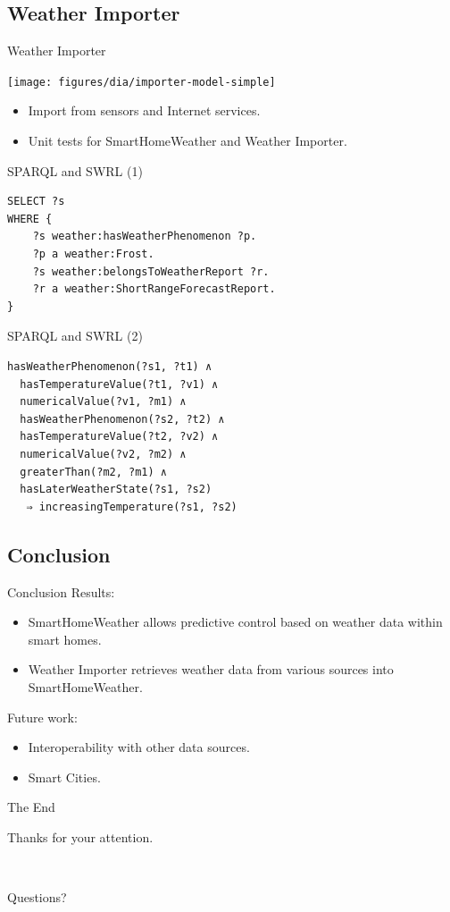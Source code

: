 \documentclass{beamer}
\begin{document}
\subsection{Weather Importer}

\begin{frame}{Weather Importer}
	\begin{center}
		\texttt{[image: figures/dia/importer-model-simple]}
	\end{center}

	\begin{itemize}
		\item Import from sensors and Internet services.
		\item Unit tests for SmartHomeWeather and Weather Importer.
	\end{itemize}
\end{frame}

\begin{frame}[fragile]{SPARQL and SWRL (1)}
	\begin{framed}
		\begin{verbatim}
SELECT ?s
WHERE {
    ?s weather:hasWeatherPhenomenon ?p.
    ?p a weather:Frost.
    ?s weather:belongsToWeatherReport ?r.
    ?r a weather:ShortRangeForecastReport.
}
		\end{verbatim}
	\end{framed}
\end{frame}

\begin{frame}[fragile]{SPARQL and SWRL (2)}
	\begin{framed}
		\begin{verbatim}
hasWeatherPhenomenon(?s1, ?t1) ∧
  hasTemperatureValue(?t1, ?v1) ∧
  numericalValue(?v1, ?m1) ∧
  hasWeatherPhenomenon(?s2, ?t2) ∧
  hasTemperatureValue(?t2, ?v2) ∧
  numericalValue(?v2, ?m2) ∧
  greaterThan(?m2, ?m1) ∧
  hasLaterWeatherState(?s1, ?s2)
   ⇒ increasingTemperature(?s1, ?s2)
		\end{verbatim}
	\end{framed}
\end{frame}

\subsection{Conclusion}

\begin{frame}{Conclusion}
	Results:
	\begin{itemize}
		\item SmartHomeWeather allows predictive control based on weather data within smart homes.
		\item Weather Importer retrieves weather data from various sources into SmartHomeWeather.
	\end{itemize}

	Future work:
	\begin{itemize}
		\item Interoperability with other data sources.
		\item Smart Cities.
	\end{itemize}
\end{frame}

\begin{frame}{The End}
	\begin{center}
		Thanks for your attention.

		~

		Questions?
	\end{center}
\end{frame}
\end{document}
